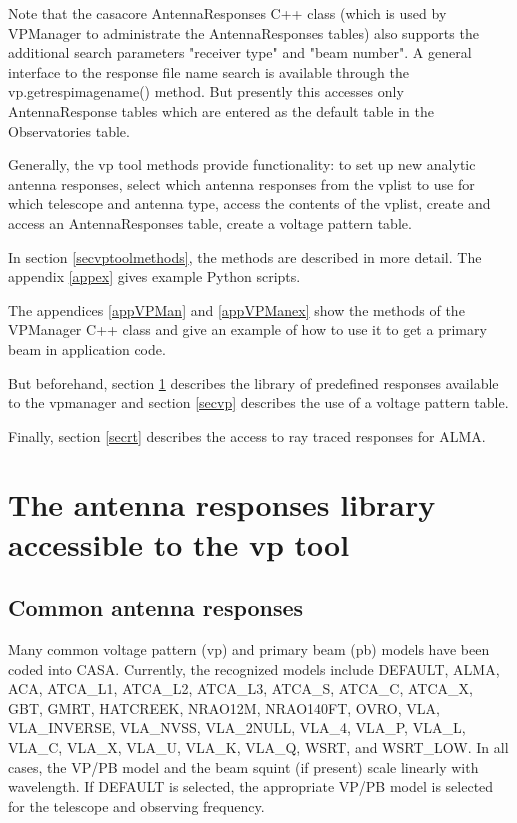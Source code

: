\documentclass[12pt]{article}
\begin{document}
Note that the casacore AntennaResponses C++ class (which is used by VPManager to
administrate the AntennaResponses tables) also supports the additional search parameters
"receiver type" and "beam number". A general interface to the response file name search
is available through the vp.getrespimagename() method. But presently this accesses only
AntennaResponse tables which are entered as the default table in the Observatories table.

Generally, the vp tool methods provide functionality:
to set up new analytic antenna responses,
select which antenna responses from the vplist to use for which telescope and antenna type, 
access the contents of the vplist,
create and access an AntennaResponses table,
create a voltage pattern table.

In section \ref{secvptoolmethods}, the methods are described in more detail.
The appendix \ref{appex} gives example Python scripts.

The appendices \ref{appVPMan} and \ref{appVPManex} show the methods of the VPManager C++ class
and give an example of how to use it to get a primary beam in application code.

But beforehand, section \ref{seclib} describes the library of predefined responses 
available to the vpmanager and section \ref{secvp} describes the use of a voltage pattern table.

Finally, section \ref{secrt} describes the access to ray traced responses for ALMA.

\section{The antenna responses library accessible to the vp tool}
\label{seclib}

\subsection{Common antenna responses}

Many common voltage pattern (vp) and primary beam (pb)
models have been coded into CASA.  Currently, the recognized models include
DEFAULT, ALMA, ACA, ATCA\_L1, ATCA\_L2, ATCA\_L3, ATCA\_S, ATCA\_C, ATCA\_X, GBT, GMRT,
HATCREEK, NRAO12M, NRAO140FT, OVRO, VLA, VLA\_INVERSE, VLA\_NVSS,
VLA\_2NULL, VLA\_4, VLA\_P, VLA\_L, VLA\_C, VLA\_X, VLA\_U, VLA\_K, VLA\_Q,
WSRT, and WSRT\_LOW.  In all cases, the VP/PB model and the beam squint (if
present) scale linearly with wavelength.  If DEFAULT is selected, the
appropriate VP/PB model is selected for the telescope and observing frequency.
\end{document}

